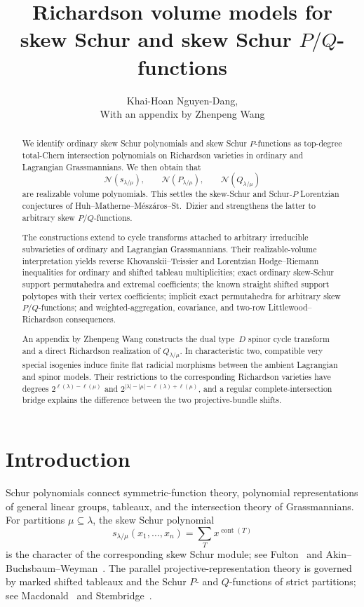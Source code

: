 \documentclass[11pt,a4paper,oneside]{amsart}
\title[Richardson volume models in types A, C, and D]{Richardson volume models for skew Schur and skew Schur $P/Q$-functions}
\author{Khai-Hoan Nguyen-Dang,\\With an appendix by Zhenpeng Wang}
\date{}
\numberwithin{equation}{section}
\theoremstyle{definition}
\theoremstyle{remark}
\newcommand{\cN}{\mathcal N}
\begin{document}
\begin{abstract}
We identify ordinary skew Schur polynomials and skew Schur $P$-functions as top-degree total-Chern intersection polynomials on Richardson varieties in ordinary and Lagrangian Grassmannians.  We then obtain that
\[
 \cN(s_{\lambda/\mu}),\qquad
 \cN(P_{\lambda/\mu}),\qquad
 \cN(Q_{\lambda/\mu})
\]
are realizable volume polynomials.  This settles the skew-Schur and Schur-$P$ Lorentzian conjectures of Huh--Matherne--M\'esz\'aros--St.~Dizier and strengthens the latter to arbitrary skew $P/Q$-functions.

The constructions extend to cycle transforms attached to arbitrary irreducible subvarieties of ordinary and Lagrangian Grassmannians.  Their realizable-volume interpretation yields reverse Khovanskii--Teissier and Lorentzian Hodge--Riemann inequalities for ordinary and shifted tableau multiplicities; exact ordinary skew-Schur support permutahedra and extremal coefficients; the known straight shifted support polytopes with their vertex coefficients; implicit exact permutahedra for arbitrary skew $P/Q$-functions; and weighted-aggregation, covariance, and two-row Littlewood--Richardson consequences.

An appendix by Zhenpeng Wang constructs the dual type~$D$ spinor cycle transform and a direct Richardson realization of $Q_{\lambda/\mu}$.  In characteristic two, compatible very special isogenies induce finite flat radicial morphisms between the ambient Lagrangian and spinor models.  Their restrictions to the corresponding Richardson varieties have degrees $2^{\ell(\lambda)-\ell(\mu)}$ and $2^{|\lambda|-|\mu|-\ell(\lambda)+\ell(\mu)}$, and a regular complete-intersection bridge explains the difference between the two projective-bundle shifts.
\end{abstract}

\maketitle

\section{Introduction}\label{sec:introduction}

Schur polynomials connect symmetric-function theory, polynomial representations of general linear groups, tableaux, and the intersection theory of Grassmannians.  For partitions $\mu\subseteq\lambda$, the skew Schur polynomial
\[
 s_{\lambda/\mu}(x_1,\ldots,x_n)
 =\sum_T x^{\operatorname{cont}(T)}
\]
is the character of the corresponding skew Schur module; see Fulton~\cite[Chapters~1 and~9]{FultonYT} and Akin--Buchsbaum--Weyman~\cite{ABW82}.  The parallel projective-representation theory is governed by marked shifted tableaux and the Schur $P$- and $Q$-functions of strict partitions; see Macdonald~\cite[Chapter~III, Section~8]{Macdonald} and Stembridge~\cite{Stembridge89}.
\end{document}
